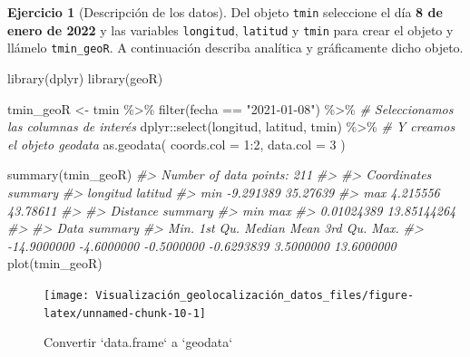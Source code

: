 \documentclass[
]{report}
\newenvironment{Shaded}{\begin{snugshade}}{\end{snugshade}}
\newcommand{\AttributeTok}[1]{\textcolor[rgb]{0.77,0.63,0.00}{#1}}
\newcommand{\CommentTok}[1]{\textcolor[rgb]{0.56,0.35,0.01}{\textit{#1}}}
\newcommand{\DecValTok}[1]{\textcolor[rgb]{0.00,0.00,0.81}{#1}}
\newcommand{\FunctionTok}[1]{\textcolor[rgb]{0.00,0.00,0.00}{#1}}
\newcommand{\NormalTok}[1]{#1}
\newcommand{\OtherTok}[1]{\textcolor[rgb]{0.56,0.35,0.01}{#1}}
\newcommand{\SpecialCharTok}[1]{\textcolor[rgb]{0.00,0.00,0.00}{#1}}
\newcommand{\StringTok}[1]{\textcolor[rgb]{0.31,0.60,0.02}{#1}}
\theoremstyle{definition}
\theoremstyle{definition}
\theoremstyle{definition}
\newtheorem{exercise}{Ejercicio}[chapter]
\theoremstyle{definition}
\theoremstyle{remark}
\begin{document}
\begin{exercise}[Descripción de los datos]
\protect\hypertarget{exr:ex4}{}\label{exr:ex4}Del objeto \texttt{tmin} seleccione el día \textbf{8 de enero de 2022} y las variables
\texttt{longitud}, \texttt{latitud} y \texttt{tmin} para crear el objeto y llámelo \texttt{tmin\_geoR}. A
continuación describa analítica y gráficamente dicho objeto.
\end{exercise}

\begin{Shaded}
\begin{Highlighting}[]
\FunctionTok{library}\NormalTok{(dplyr)}
\FunctionTok{library}\NormalTok{(geoR)}

\NormalTok{tmin\_geoR }\OtherTok{\textless{}{-}}\NormalTok{ tmin }\SpecialCharTok{\%\textgreater{}\%}
  \FunctionTok{filter}\NormalTok{(fecha }\SpecialCharTok{==} \StringTok{"2021{-}01{-}08"}\NormalTok{) }\SpecialCharTok{\%\textgreater{}\%}
  \CommentTok{\# Seleccionamos las columnas de interés}
\NormalTok{  dplyr}\SpecialCharTok{::}\FunctionTok{select}\NormalTok{(longitud, latitud, tmin) }\SpecialCharTok{\%\textgreater{}\%}
  \CommentTok{\# Y creamos el objeto geodata}
  \FunctionTok{as.geodata}\NormalTok{(}
    \AttributeTok{coords.col =} \DecValTok{1}\SpecialCharTok{:}\DecValTok{2}\NormalTok{,}
    \AttributeTok{data.col =} \DecValTok{3}
\NormalTok{  )}


\FunctionTok{summary}\NormalTok{(tmin\_geoR)}
\CommentTok{\#\textgreater{} Number of data points: 211 }
\CommentTok{\#\textgreater{} }
\CommentTok{\#\textgreater{} Coordinates summary}
\CommentTok{\#\textgreater{}      longitud  latitud}
\CommentTok{\#\textgreater{} min {-}9.291389 35.27639}
\CommentTok{\#\textgreater{} max  4.215556 43.78611}
\CommentTok{\#\textgreater{} }
\CommentTok{\#\textgreater{} Distance summary}
\CommentTok{\#\textgreater{}         min         max }
\CommentTok{\#\textgreater{}  0.01024389 13.85144264 }
\CommentTok{\#\textgreater{} }
\CommentTok{\#\textgreater{} Data summary}
\CommentTok{\#\textgreater{}        Min.     1st Qu.      Median        Mean     3rd Qu.        Max. }
\CommentTok{\#\textgreater{} {-}14.9000000  {-}4.6000000  {-}0.5000000  {-}0.6293839   3.5000000  13.6000000}
\FunctionTok{plot}\NormalTok{(tmin\_geoR)}
\end{Highlighting}
\end{Shaded}

\begin{figure}

{\centering \texttt{[image: Visualización\_geolocalización\_datos\_files/figure-latex/unnamed-chunk-10-1]} 

}

\caption{Convertir `data.frame` a `geodata`}\label{fig:unnamed-chunk-10}
\end{figure}
\end{document}
